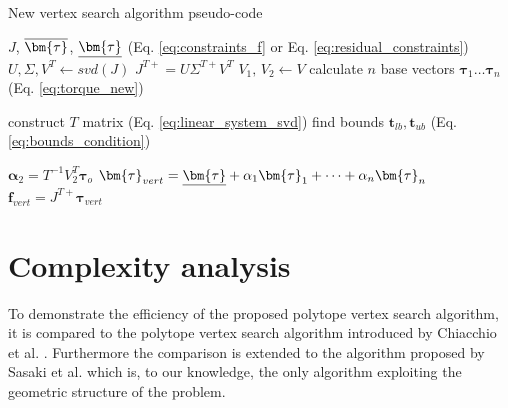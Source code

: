 \begin{algorithm}[!h]
\caption{New vertex search algorithm pseudo-code}
\begin{algorithmic}
\REQUIRE $J$, $\onum{\bm{\tau}}$, $\unum{\bm{\tau}}$ (Eq. \ref{eq:constraints_f} or Eq. \ref{eq:residual_constraints}) 
\STATE $U, \Sigma, V^T \leftarrow svd(J)$ 
\STATE $J^{T+} = U\Sigma^{T+}V^T$
\STATE $V_1,\, V_2  \leftarrow V $
\STATE calculate $n$ base vectors $\bm{\tau}_1 \dotsc \bm{\tau}_n$ (Eq. \ref{eq:torque_new})

\STATE construct $T$ matrix (Eq. \ref{eq:linear_system_svd})
\STATE find bounds $\bm{t}_{lb},\bm{t}_{ub}$ (Eq. \ref{eq:bounds_condition})

\STATE $\bm{\alpha}_2 = T^{-1}V_2^T\bm{\tau}_o $
\IF{$ \bm{\alpha}_2 \in [0,1] $}
\STATE $\bm{\tau}_{vert} = \unum{\bm{\tau}} + \alpha_1{\bm{\tau}_{1}} +\dots+\alpha_n{\bm{\tau}_{n}}$
\STATE $\bm{f}_{vert} = J^{T+}\bm{\tau}_{vert}$
\ENDIF
\ENDIF
\ENDFOR
\ENDFOR

\end{algorithmic}
\label{alg:main_algo}
\end{algorithm}

\section{Complexity analysis}\label{sec:complexity}
To demonstrate the efficiency of the proposed polytope vertex search algorithm, it is compared to the polytope vertex search algorithm introduced by Chiacchio et al. \cite{chiacchio_evaluation_1996}. Furthermore the comparison is extended to the algorithm proposed by Sasaki et al. \cite{sasaki_vertex_nodate} which is, to our knowledge, the only algorithm exploiting the geometric structure of the problem.


